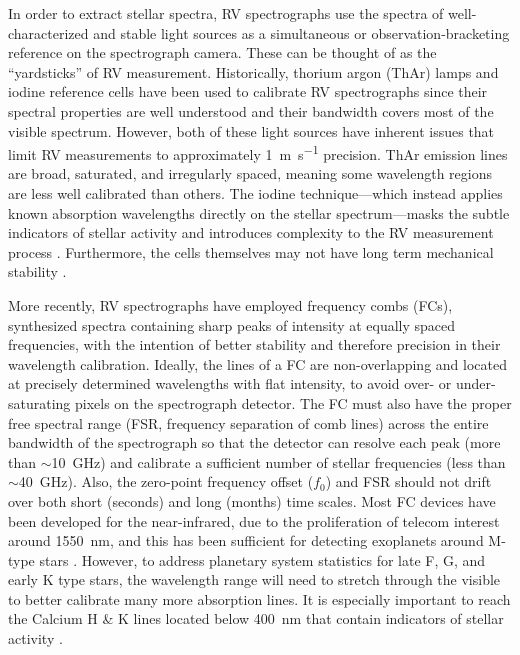 In order to extract stellar spectra, RV spectrographs use the spectra of well-characterized and stable light sources as a simultaneous or observation-bracketing reference on the spectrograph camera. These can be thought of as the ``yardsticks'' of RV measurement. Historically, thorium argon (ThAr) lamps and iodine reference cells have been used to calibrate RV spectrographs since their spectral properties are well understood and their bandwidth covers most of the visible spectrum. However, both of these light sources have inherent issues that limit RV measurements to approximately \SI{1}{\meter\per\second} precision. ThAr emission lines are broad, saturated, and irregularly spaced, meaning some wavelength regions are less well calibrated than others. The iodine technique---which instead applies known absorption wavelengths directly on the stellar spectrum---masks the subtle indicators of stellar activity and introduces complexity to the RV measurement process \citep{spronck_fiber_2015}. Furthermore, the cells themselves may not have long term mechanical stability \citep{fischer_twenty-five_2014}.

More recently, RV spectrographs have employed frequency combs (FCs), synthesized spectra containing sharp peaks of intensity at equally spaced frequencies, with the intention of better stability and therefore precision in their wavelength calibration. Ideally, the lines of a FC are non-overlapping and located at precisely determined wavelengths with flat intensity, to avoid over- or under-saturating pixels on the spectrograph detector. The FC must also have the proper free spectral range (FSR, frequency separation of comb lines) across the entire bandwidth of the spectrograph so that the detector can resolve each peak (more than $\sim$\SI{10}{\giga\hertz}) and calibrate a sufficient number of stellar frequencies (less than $\sim$\SI{40}{\giga\hertz}). Also, the zero-point frequency offset ($f_0$) and FSR should not drift over both short (seconds) and long (months) time scales. Most FC devices have been developed for the near-infrared, due to the proliferation of telecom interest around \SI{1550}{\nano\meter}, and this has been sufficient for detecting exoplanets around M-type stars \citep{fischer_state_2016}. However, to address planetary system statistics for late F, G, and early K type stars, the wavelength range will need to stretch through the visible to better calibrate many more absorption lines. It is especially important to reach the Calcium H \& K lines located below \SI{400}{\nano\meter} that contain indicators of stellar activity \citep{isaacson_chromospheric_2010, lovis_harps_2011}.

